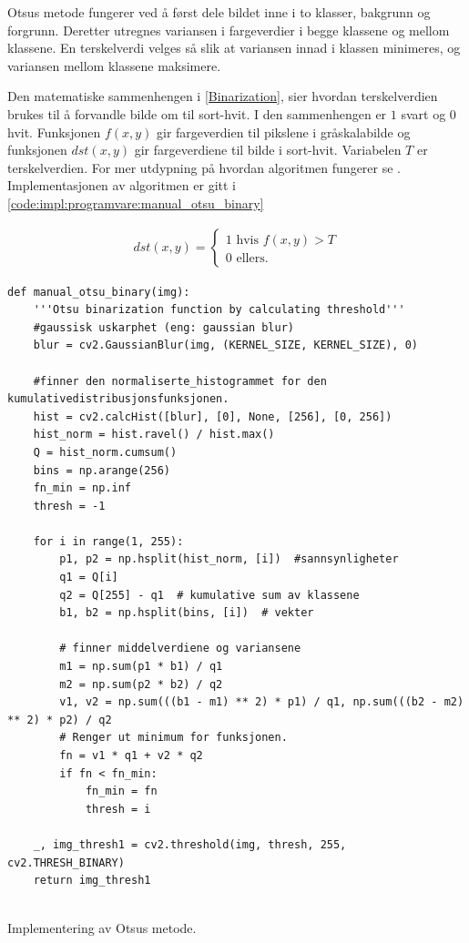 Otsus metode fungerer ved å først dele bildet inne i to klasser, bakgrunn og forgrunn. 
Deretter utregnes variansen i fargeverdier i begge klassene og mellom klassene. 
En terskelverdi velges så slik at variansen innad i klassen minimeres, og variansen mellom klassene maksimere. 


Den matematiske sammenhengen i \eqref{Binarization}, sier hvordan terskelverdien brukes til å forvandle bilde om til sort-hvit. 
I den sammenhengen er $1$ svart og $0$ hvit. 
Funksjonen $f(x,y)$ gir fargeverdien til pikslene i gråskalabilde og funksjonen $dst(x,y)$ gir fargeverdiene til bilde i sort-hvit. 
Variabelen $T$ er terskelverdien. 
For mer utdypning på hvordan algoritmen fungerer se \cite{otsu}.
Implementasjonen av algoritmen er gitt i \autoref{code:impl:programvare:manual_otsu_binary}

\begin{align}
    dst(x,y)= \begin{cases} 
        1 \text{ hvis } f(x,y) > T\\
        0 \text{ ellers.}
   \end{cases}\label{Binarization}
\end{align}


\begin{listing}[!htb]
\begin{verbatim}
def manual_otsu_binary(img):
    '''Otsu binarization function by calculating threshold'''
    #gaussisk uskarphet (eng: gaussian blur)
    blur = cv2.GaussianBlur(img, (KERNEL_SIZE, KERNEL_SIZE), 0)  
    
    #finner den normaliserte_histogrammet for den kumulativedistribusjonsfunksjonen.
    hist = cv2.calcHist([blur], [0], None, [256], [0, 256])
    hist_norm = hist.ravel() / hist.max()
    Q = hist_norm.cumsum()
    bins = np.arange(256)
    fn_min = np.inf
    thresh = -1

    for i in range(1, 255):
        p1, p2 = np.hsplit(hist_norm, [i])  #sannsynligheter 
        q1 = Q[i]
        q2 = Q[255] - q1  # kumulative sum av klassene
        b1, b2 = np.hsplit(bins, [i])  # vekter 
        
        # finner middelverdiene og variansene
        m1 = np.sum(p1 * b1) / q1
        m2 = np.sum(p2 * b2) / q2
        v1, v2 = np.sum(((b1 - m1) ** 2) * p1) / q1, np.sum(((b2 - m2) ** 2) * p2) / q2
        # Renger ut minimum for funksjonen. 
        fn = v1 * q1 + v2 * q2
        if fn < fn_min:
            fn_min = fn
            thresh = i

    _, img_thresh1 = cv2.threshold(img, thresh, 255, cv2.THRESH_BINARY)
    return img_thresh1
    
\end{verbatim}
\caption{Implementering av Otsus metode. }
\label{code:impl:programvare:manual_otsu_binary}
\end{listing}

